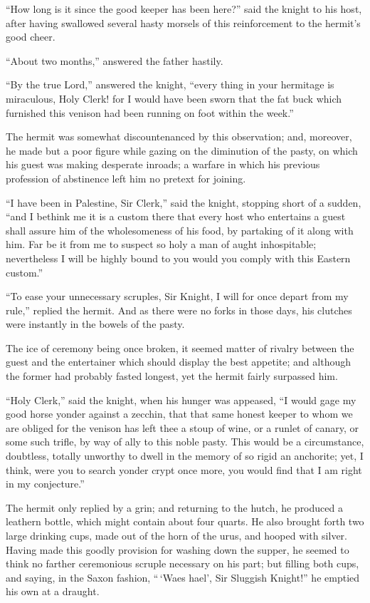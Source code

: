 ``How long is it since the good keeper has been here?'' said the knight
to his host, after having swallowed several hasty morsels of this
reinforcement to the hermit's good cheer.

``About two months,'' answered the father hastily.

``By the true Lord,'' answered the knight, ``every thing in your
hermitage is miraculous, Holy Clerk! for I would have been sworn that
the fat buck which furnished this venison had been running on foot
within the week.''

The hermit was somewhat discountenanced by this observation; and,
moreover, he made but a poor figure while gazing on the diminution of
the pasty, on which his guest was making desperate inroads; a warfare in
which his previous profession of abstinence left him no pretext for
joining.

``I have been in Palestine, Sir Clerk,'' said the knight, stopping short
of a sudden, ``and I bethink me it is a custom there that every host who
entertains a guest shall assure him of the wholesomeness of his food, by
partaking of it along with him. Far be it from me to suspect so holy a
man of aught inhospitable; nevertheless I will be highly bound to you
would you comply with this Eastern custom.''

``To ease your unnecessary scruples, Sir Knight, I will for once depart
from my rule,'' replied the hermit. And as there were no forks in those
days, his clutches were instantly in the bowels of the pasty.

The ice of ceremony being once broken, it seemed matter of rivalry
between the guest and the entertainer which should display the best
appetite; and although the former had probably fasted longest, yet the
hermit fairly surpassed him.

``Holy Clerk,'' said the knight, when his hunger was appeased, ``I would
gage my good horse yonder against a zecchin, that that same honest
keeper to whom we are obliged for the venison has left thee a stoup of
wine, or a runlet of canary, or some such trifle, by way of ally to this
noble pasty. This would be a circumstance, doubtless, totally unworthy
to dwell in the memory of so rigid an anchorite; yet, I think, were you
to search yonder crypt once more, you would find that I am right in my
conjecture.''

The hermit only replied by a grin; and returning to the hutch, he
produced a leathern bottle, which might contain about four quarts. He
also brought forth two large drinking cups, made out of the horn of the
urus, and hooped with silver. Having made this goodly provision for
washing down the supper, he seemed to think no farther ceremonious
scruple necessary on his part; but filling both cups, and saying, in the
Saxon fashion, ``\,`Waes hael', Sir Sluggish Knight!'' he emptied his
own at a draught.

